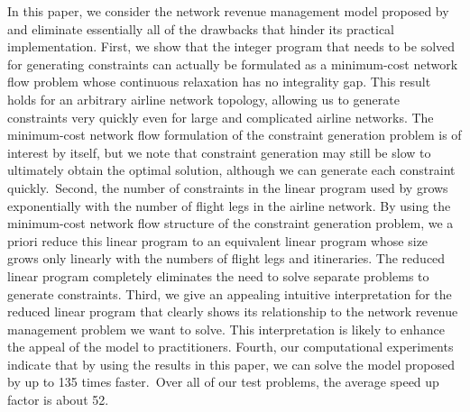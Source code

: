 In this paper, we consider the network revenue management model proposed by  and eliminate essentially all of the drawbacks that hinder its practical implementation. First, we show that the integer program that needs to be solved for generating constraints can actually be formulated as a minimum-cost network flow problem whose continuous relaxation has no integrality gap. This result holds for an arbitrary airline network topology, allowing us to generate constraints very quickly even for large and complicated airline networks. The minimum-cost network flow formulation of the constraint generation problem is of interest by itself, but we note that constraint generation may still be slow to ultimately obtain the optimal solution, although we can generate each constraint quickly.~Second, the number of constraints in the linear program used by  grows exponentially with the number of flight legs in the airline network. By using the minimum-cost network flow structure of the constraint generation problem, we a priori reduce this linear program to an equivalent linear program whose size grows only linearly with the numbers of flight legs and itineraries. The reduced linear program completely eliminates the need to solve separate problems to generate constraints. Third, we give an appealing intuitive interpretation for the reduced linear program that clearly shows its relationship to the network revenue management problem we want to solve. This interpretation is likely to enhance the appeal of the model to practitioners. Fourth, our computational experiments indicate that by using the results in this paper, we can solve the model proposed by  up to 135 times faster.~Over all of our test problems, the average speed up factor is about 52.


